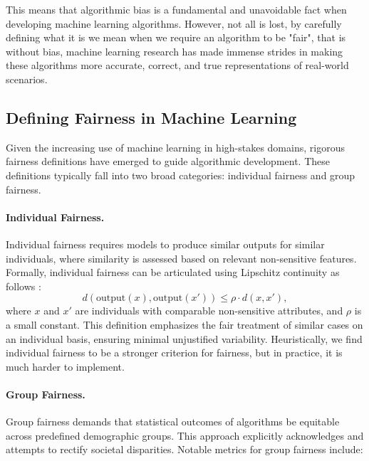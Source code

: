 This means that algorithmic bias is a fundamental and unavoidable
fact when developing machine learning algorithms. However, not all is
lost, by carefully defining what it is we mean when we require an
algorithm to be "fair", that is without bias, machine learning
research has made immense strides in making these algorithms more
accurate, correct, and true representations of real-world scenarios.
\subsection{Defining Fairness in Machine
Learning}\label{subsec:fairness_definitions}

Given the increasing use of machine learning in high-stakes domains,
rigorous fairness definitions have emerged to guide
algorithmic development. These definitions typically fall into two
broad categories: individual fairness and group fairness.

\paragraph{Individual Fairness.}
Individual fairness requires models to produce similar outputs for
similar individuals, where similarity is assessed based
on relevant non-sensitive features. Formally, individual fairness can
be articulated using Lipschitz continuity
as follows \cite{dwork2012fairness}:
\[
  d(\text{output}(x), \text{output}(x')) \leq \rho \cdot d(x, x'),
\]
where \(x\) and \(x'\) are individuals with comparable non-sensitive
attributes, and \(\rho\) is a small constant. This definition
emphasizes the fair treatment of similar cases on an individual
basis, ensuring minimal unjustified variability. Heuristically, we
find individual fairness to be a stronger criterion for fairness, but
in practice, it is much harder to implement.

\paragraph{Group Fairness.}
Group fairness demands that statistical outcomes of algorithms be
equitable across predefined demographic groups.
This approach explicitly acknowledges and attempts to rectify
societal disparities. Notable metrics
for group fairness include:

